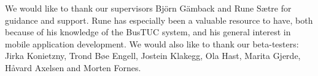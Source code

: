 We would like to thank our supervisors Bj\"{o}rn G\"{a}mback and Rune S\ae tre for guidance and support. Rune has especially been a valuable resource to have, both because of his knowledge of the BusTUC system, and his general interest in mobile application development. 
We would also like to thank our beta-testers: Jirka Konietzny, Trond B\o e Engell, Jostein Klakegg, Ola Hast, Marita Gjerde, H\aa vard Axelsen and Morten Fornes. 
